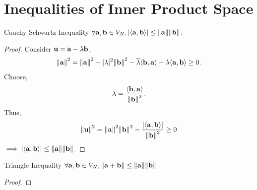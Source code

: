 \documentclass{book}
\def\innerproduct#1#2{\langle#1,#2\rangle}
\begin{document}
\section{Inequalities of Inner Product Space}
\begin{Theorems}{Cauchy-Schwartz Inequality}{}
	$\forall \vb{a},\vb{b} \in V_N, \abs{\innerproduct{\vb{a}}{\vb{b}}} \leq \norm{\vb{a}}\norm{\vb{b}}$.
\end{Theorems}
\begin{proof}
	Consider $\vb{u} = \vb{a} - \lambda\vb{b}$,
	\begin{equation}
		\norm{\vb{a}}^2 = \norm{\vb{a}}^2 + |\lambda|^2\norm{\vb{b}}^2 - \overline{\lambda}\innerproduct{\vb{b}}{\vb{a}} - \lambda\innerproduct{\vb{a}}{\vb{b}} \geq 0.
	\end{equation}
Choose, 
\begin{equation}
	\lambda = \frac{\innerproduct{\vb{b}}{\vb{a}}}{\norm{\vb{b}}^2}.
\end{equation}
Thus,
\begin{equation}
	\begin{split}
		\norm{\vb{u}}^2 = \norm{\vb{a}}^2 \norm{\vb{b}}^2 - \frac{\abs{\innerproduct{\vb{a}}{\vb{b}}}}{\norm{\vb{b}}^2} \geq 0
	\end{split}
\end{equation}
$\implies \abs{\innerproduct{\vb{a}}{\vb{b}}} \leq \norm{\vb{a}}\norm{\vb{b}}$.
\end{proof}
\begin{Theorems}{Triangle Inequality}{}
	$\forall \vb{a},\vb{b} \in V_N, \norm{\vb{a} + \vb{b}}  \leq \norm{\vb{a}}\norm{\vb{b}}$
\end{Theorems}
\begin{proof}
	
\end{proof}
\end{document}
